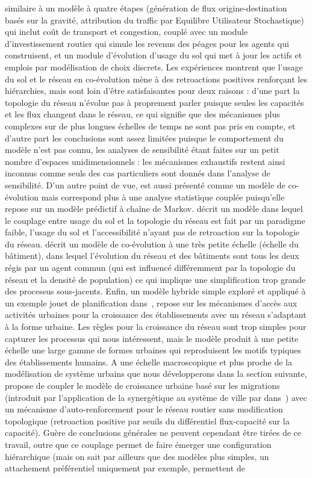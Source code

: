 {similaire à un modèle à quatre étapes (génération de flux origine-destination basés sur la gravité, attribution du traffic par Equilibre Utilisateur Stochastique) qui inclut coût de transport et congestion, couplé avec un module d'investissement routier qui simule les revenus des péages pour les agents qui construisent, et un module d'évolution d'usage du sol qui met à jour les actifs et emplois par modélisation de choix discrets. Les expériences montrent que l'usage du sol et le réseau en co-évolution mène à des retroactions positives renforçant les hiérarchies, mais sont loin d'être satisfaisantes pour deux raisons : d'une part la topologie du réseau n'évolue pas à proprement parler puisque seules les capacités et les flux changent dans le réseau, ce qui signifie que des mécanismes plus complexes sur de plus longues échelles de temps ne sont pas pris en compte, et d'autre part les conclusions sont assez limitées puisque le comportement du modèle n'est pas connu, les analyses de sensibilité étant faites sur un petit nombre d'espaces unidimensionnels : les mécanismes exhaustifs restent ainsi inconnus comme seuls des cas particuliers sont donnés dans l'analyse de sensibilité. D'un autre point de vue, \cite{levinson2005paving} est aussi présenté comme un modèle de co-évolution mais correspond plus à une analyse statistique couplée puisqu'elle repose sur un modèle prédictif à chaîne de Markov. \cite{rui2011urban} décrit un modèle dans lequel le couplage entre usage du sol et la topologie du réseau est fait par un paradigme faible, l'usage du sol et l'accessibilité n'ayant pas de retroaction sur la topologie du réseau. \cite{achibet2014model} décrit un modèle de co-évolution à une très petite échelle (échelle du bâtiment), dans lequel l'évolution du réseau et des bâtiments sont tous les deux régis par un agent commun (qui est influencé différemment par la topologie du réseau et la densité de population) ce qui implique une simplification trop grande des processus sous-jacents. Enfin, un modèle hybride simple exploré et appliqué à un exemple jouet de planification dans~\cite{raimbault2014hybrid}, repose sur les mécanismes d'accès aux activités urbaines pour la croissance des établissements avec un réseau s'adaptant à la forme urbaine. Les règles pour la croissance du réseau sont trop simples pour capturer les processus qui nous intéressent, mais le modèle produit à une petite échelle une large gamme de formes urbaines qui reproduisent les motifs typiques des établissements humains. A une échelle macroscopique et plus proche de la modélisation de système urbains que nous développerons dans la section suivante, \cite{baptiste1999interactions} propose de coupler le modèle de croissance urbaine basé sur les migrations (introduit par l'application de la synergétique au système de ville par  dans~\cite{sanders1992systeme}) avec un mécanisme d'auto-renforcement pour le réseau routier sans modification topologique (retroaction positive par seuils du différentiel flux-capacité sur la capacité). Guère de conclusions générales ne peuvent cependant être tirées de ce travail, outre que ce couplage permet de faire émerger une configuration hiérarchique (mais on sait par ailleurs que des modèles plus simples, un attachement préférentiel uniquement par exemple, permettent de }
